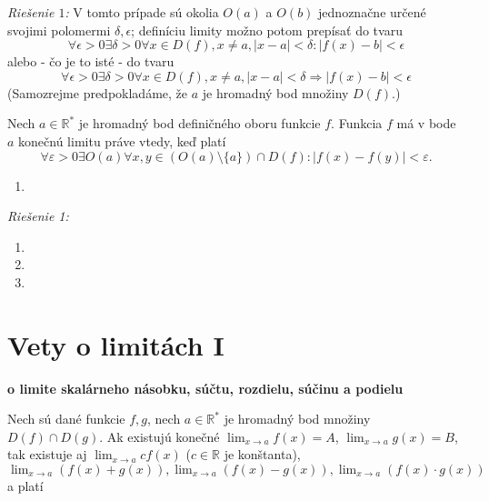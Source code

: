 \textit{Riešenie $1$:}
V tomto prípade sú okolia $O(a)$ a $O(b)$ jednoznačne určené svojimi polomermi
$\delta,\epsilon$; definíciu limity možno potom prepísať do tvaru
\[
  \forall \epsilon > 0 \exists \delta > 0 \forall x \in D(f),
  x \neq a, |x-a|<\delta:|f(x)-b|<\epsilon
\]
alebo - čo je to isté - do tvaru
\[
  \forall \epsilon > 0 \exists \delta > 0 \forall x \in D(f),
  x \neq a, |x-a|<\delta \Rightarrow |f(x)-b|<\epsilon
\]
(Samozrejme predpokladáme, že $a$ je hromadný bod množiny $D(f)$.)

\begin{veta}

Nech $a \in \mathbb{R}^*$ je hromadný bod definičného oboru funkcie $f$. Funkcia
$f$ má v bode $a$ konečnú limitu práve vtedy, keď platí
\[
  \forall \varepsilon > 0 \exists O(a) \forall x,y \in
  (O(a) \setminus \{ a \}) \cap D(f): |f(x)-f(y)|<\varepsilon.
\]
\end{veta}

\begin{enumerate}[resume]
  \item {}
\end{enumerate}

\textit{Riešenie 1:}


\begin{enumerate}[resume]
  \item {}
  \item {}
  \item {}
\end{enumerate}

\section{Vety o limitách I}
\begin{veta}
\textbf{o limite skalárneho násobku, súčtu, rozdielu, súčinu a podielu}

Nech sú dané funkcie $f,g$, nech $a \in \mathbb{R^*}$ je hromadný bod množiny $D(f) \cap D(g)$. Ak existujú konečné $\lim_{x \rightarrow a} f(x)=A$, $\lim_{x \rightarrow a} g(x)=B$, tak existuje aj $\lim_{x \rightarrow a} cf(x)$ ($c \in \mathbb{R}$ je konštanta), $\lim_{x \rightarrow a} (f(x)+g(x)),\lim_{x \rightarrow a} (f(x)-g(x)),\lim_{x \rightarrow a} (f(x) \cdot g(x))$ a platí
\end{veta}


